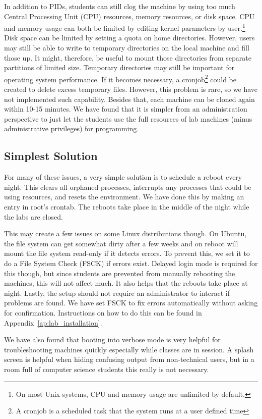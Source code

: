 In addition to PIDs, students can still clog the machine by using too much Central Processing Unit (CPU) resources, memory resources, or disk space.  CPU and memory usage can both be limited by editing kernel parameters by user.\footnote{On most Unix systems, CPU and memory usage are unlimited by default.}  Disk space can be limited by setting a quota on home directories.  However, users may still be able to write to temporary directories on the local machine and fill those up.  It might, therefore, be useful to mount those directories from separate partitions of limited size.  Temporary directories may still be important for operating system performance.  If it becomes necessary, a cronjob\footnote{A cronjob is a scheduled task that the system runs at a user defined time} could be created to delete excess temporary files.  However, this problem is rare, so we have not implemented such capability.  Besides that, each machine can be cloned again within 10-15 minutes.  We have found that it is simpler from an administration perspective to just let the students use the full resources of lab machines (minus administrative privileges) for programming.  

\subsection{Simplest Solution}
For many of these issues, a very simple solution is to schedule a reboot every night.  This clears all orphaned processes, interrupts any processes that could be using resources, and resets the environment.  We have done this by making an entry in root's crontab.  The reboots take place in the middle of the night while the labs are closed. 

This may create a few issues on some Linux distributions though.  On Ubuntu, the file system can get somewhat dirty after a few weeks and on reboot will mount the file system read-only if it detects errors.  To prevent this, we set it to do a File System Check (FSCK) if errors exist.  Delayed login mode is required for this though, but since students are prevented from manually rebooting the machines, this will not affect much.  It also helps that the reboots take place at night.  Lastly, the setup should not require an administrator to interact if problems are found.  We have set FSCK to fix errors automatically without asking for confirmation.  Instructions on how to do this can be found in Appendix~\ref{ap:lab_installation}.

We have also found that booting into verbose mode is very helpful for troubleshooting machines quickly especially while classes are in session.  A splash screen is helpful when hiding confusing output from non-technical users, but in a room full of computer science students this really is not necessary.  
